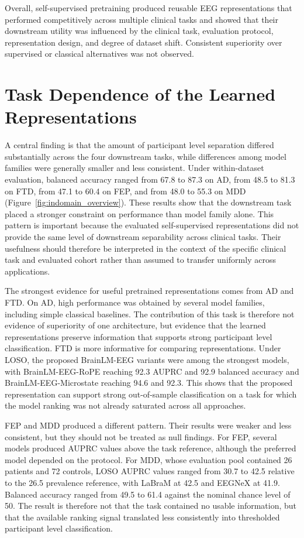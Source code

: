 Overall, self-supervised pretraining produced reusable EEG representations that performed competitively across multiple clinical tasks and showed that their downstream utility was influenced by the clinical task, evaluation protocol, representation design, and degree of dataset shift. Consistent superiority over supervised or classical alternatives was not observed.


\section{Task Dependence of the Learned Representations}\label{sec:d_clinical}

A central finding is that the amount of participant level separation differed substantially across the four downstream tasks, while differences among model families were generally smaller and less consistent. Under within-dataset evaluation, balanced accuracy ranged from 67.8 to 87.3 on AD, from 48.5 to 81.3 on FTD, from 47.1 to 60.4 on FEP, and from 48.0 to 55.3 on MDD (Figure~\ref{fig:indomain_overview}). These results show that the downstream task placed a stronger constraint on performance than model family alone. This pattern is important because the evaluated self-supervised representations did not provide the same level of downstream separability across clinical tasks. Their usefulness should therefore be interpreted in the context of the specific clinical task and evaluated cohort rather than assumed to transfer uniformly across applications.


The strongest evidence for useful pretrained representations comes from AD and FTD. On AD, high performance was obtained by several model families, including simple classical baselines. The contribution of this task is therefore not evidence of superiority of one architecture, but evidence that the learned representations preserve information that supports strong participant level classification. FTD is more informative for comparing representations. Under LOSO, the proposed BrainLM-EEG variants were among the strongest models, with BrainLM-EEG-RoPE reaching 92.3 AUPRC and 92.9 balanced accuracy and BrainLM-EEG-Microstate reaching 94.6 and 92.3. This shows that the proposed representation can support strong out-of-sample classification on a task for which the model ranking was not already saturated across all approaches.

FEP and MDD produced a different pattern. Their results were weaker and less consistent, but they should not be treated as null findings. For FEP, several models produced AUPRC values above the task reference, although the preferred model depended on the protocol. For MDD, whose evaluation pool contained 26 patients and 72 controls, LOSO AUPRC values ranged from 30.7 to 42.5 relative to the 26.5 prevalence reference, with LaBraM at 42.5 and EEGNeX at 41.9. Balanced accuracy ranged from 49.5 to 61.4 against the nominal chance level of 50. The result is therefore not that the task contained no usable information, but that the available ranking signal translated less consistently into thresholded participant level classification.

